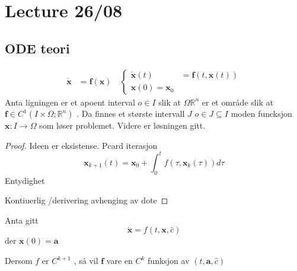 \documentclass{article}
\theoremstyle{remark}
\newcommand{\newpara}
  {
  \vskip 0.4cm
  }
\begin{document}
\section{Lecture 26/08}%
\label{sec:lecture_n}

\subsection{ODE teori}%
\label{sub:ode_teori}

\begin{theorem}
  \[
\begin{split}
  \mathbf{\dot{x}}  & = \mathbf{f} \left( \mathbf{x} \right) \quad  \begin{cases}
    \dot{\mathbf{x}} \left( t \right)    & = \mathbf{f} \left( t, \mathbf{x}\left( t \right) \right)  \\
    \mathbf{x}\left( 0 \right) = \mathbf{x}_{0}
  \end{cases} 
\end{split} 
  \] 
  Anta ligningen er et apoent interval $o \in I$ slik at $\Omega \mathbb{R} ^{n}$ er et område slik at $\mathbf{f} \in  C ^{1} \left( I \times  \Omega  ; \mathbb{R} ^{n}  \right)$
  . Da finnes et største intervall $J$ $o \in J \subseteq I $  moden funcksjon $\mathbf{x} : I \to  \Omega $ som løser problemet. Videre er løsningen gitt. 
\end{theorem}

\begin{proof}
  Ideen er eksistense. Pcard iterasjon \[
  \mathbf{x}_{k+1}\left( t \right) = \mathbf{x}_{0} + \int_{0}^{t}  f\left( \tau , \mathbf{x}_{k} \left( \tau \right)  \right)  d \tau
  \] 
  Entydighet  
  \newpara
  Kontiuerlig /derivering avhenging av dote
  \newpara

\end{proof}

\begin{theorem}
  Anta gitt \[
  \dot{\mathbf{x} } = f\left( t, \mathbf{x} , \hat{c} \right)
  \] 
  der $\mathbf{x}\left( 0 \right) = \mathbf{a}$ 
  \newpara
  Dersom $f$ er $C^{k+1}$ , så vil $\mathbf{f}$ vare en $C^{k}$ funksjon av $\left( t, \mathbf{a}, \hat{c} \right)$
\end{theorem}
\end{document}
